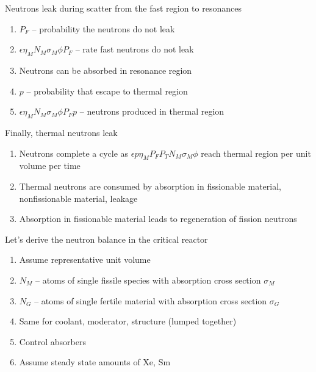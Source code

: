 \documentclass[aspectratio=1610,pdftex,dvipsnames,compress,xcolor={dvipsnames}]{beamer}
\begin{document}
\begin{frame}{Neutrons leak during scatter from the fast region to resonances}
    \begin{enumerate}[series=outerlist,topsep=0pt,itemsep=21pt,leftmargin=*,label=(\arabic*)]
        \item[]$P_F$ -- probability the neutrons do not leak
        \item[]$\epsilon\eta_M N_M\sigma_M\phi P_F$ -- rate fast neutrons do not leak
        \item[]Neutrons can be absorbed in resonance region
        \item[]$p$ -- probability that escape to thermal region
        \item[]$\epsilon\eta_M N_M\sigma_M\phi P_F p$ -- neutrons produced in thermal region
    \end{enumerate}
\end{frame}


\begin{frame}{Finally, thermal neutrons leak}
    \begin{enumerate}[series=outerlist,topsep=0pt,itemsep=21pt,leftmargin=*,label=(\arabic*)]
        \item[]Neutrons complete a cycle as $\epsilon p \eta_M P_F P_T N_M \sigma_M \phi$ reach thermal region per unit volume per time
        \item[]Thermal neutrons are consumed by absorption in fissionable material, nonfissionable material, leakage
        \item[]Absorption in fissionable material leads to regeneration of fission neutrons
    \end{enumerate}
\end{frame}


\begin{frame}{Let's derive the neutron balance in the critical reactor}
    \begin{enumerate}[series=outerlist,topsep=0pt,itemsep=21pt,leftmargin=*,label=(\arabic*)]
        \item[]Assume representative unit volume
        \item[]$N_M$ -- atoms of single fissile species with absorption cross section $\sigma_M$
        \item[]$N_G$ -- atoms of single fertile material with absorption cross section $\sigma_G$
        \item[]Same for coolant, moderator, structure (lumped together)
        \item[]Control absorbers
        \item[]Assume steady state amounts of Xe, Sm
    \end{enumerate}
\end{frame}
\end{document}
